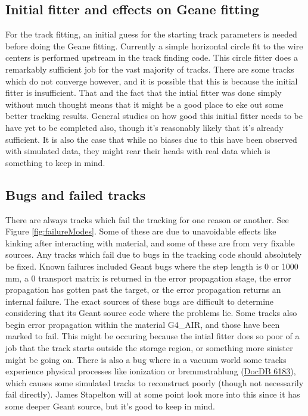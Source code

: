 	\subsection{Initial fitter and effects on Geane fitting}

		For the track fitting, an initial guess for the starting track parameters is needed before doing the Geane fitting. Currently a simple horizontal circle fit to the wire centers is performed upstream in the track finding code. This circle fitter does a remarkably sufficient job for the vast majority of tracks. There are some tracks which do not converge however, and it is possible that this is because the initial fitter is insufficient. That and the fact that the intial fitter was done simply without much thought means that it might be a good place to eke out some better tracking results. General studies on how good this initial fitter needs to be have yet to be completed also, though it's reasonably likely that it's already sufficient. It is also the case that while no biases due to this have been observed with simulated data, they might rear their heads with real data which is something to keep in mind.

	\subsection{Bugs and failed tracks}

		There are always tracks which fail the tracking for one reason or another. See Figure \ref{fig:failureModes}. Some of these are due to unavoidable effects like kinking after interacting with material, and some of these are from very fixable sources. Any tracks which fail due to bugs in the tracking code should absolutely be fixed. Known failures included Geant bugs where the step length is 0 or 1000 mm, a 0 transport matrix is returned in the error propagation stage, the error propagation has gotten past the target, or the error propagation returns an internal failure. The exact sources of these bugs are difficult to determine considering that its Geant source code where the problems lie. Some tracks also begin error propagation within the material G4\_AIR, and those have been marked to fail. This might be occuring because the intial fitter does so poor of a job that the track starts outside the storage region, or something more sinister might be going on. There is also a bug where in a vacuum world some tracks experience physical processes like ionization or bremmstrahlung (\href{https://gm2-docdb.fnal.gov/cgi-bin/private/ShowDocument?docid=6183}{DocDB 6183}), which causes some simulated tracks to reconstruct poorly (though not necessarily fail directly). James Stapelton will at some point look more into this since it has some deeper Geant source, but it's good to keep in mind.

